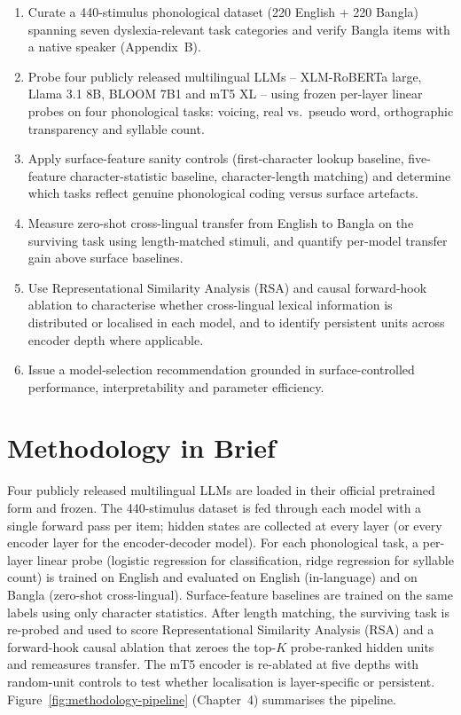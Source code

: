 \begin{enumerate}
    \item Curate a 440-stimulus phonological dataset (220 English + 220 Bangla) spanning seven dyslexia-relevant task categories and verify Bangla items with a native speaker (Appendix~B).
    \item Probe four publicly released multilingual LLMs -- XLM-RoBERTa large, Llama 3.1 8B, BLOOM 7B1 and mT5 XL -- using frozen per-layer linear probes on four phonological tasks: voicing, real vs.\ pseudo word, orthographic transparency and syllable count.
    \item Apply surface-feature sanity controls (first-character lookup baseline, five-feature character-statistic baseline, character-length matching) and determine which tasks reflect genuine phonological coding versus surface artefacts.
    \item Measure zero-shot cross-lingual transfer from English to Bangla on the surviving task using length-matched stimuli, and quantify per-model transfer gain above surface baselines.
    \item Use Representational Similarity Analysis (RSA) and causal forward-hook ablation to characterise whether cross-lingual lexical information is distributed or localised in each model, and to identify persistent units across encoder depth where applicable.
    \item Issue a model-selection recommendation grounded in surface-controlled performance, interpretability and parameter efficiency.
\end{enumerate}

\section{Methodology in Brief}

Four publicly released multilingual LLMs are loaded in their official pretrained form and frozen. The 440-stimulus dataset is fed through each model with a single forward pass per item; hidden states are collected at every layer (or every encoder layer for the encoder-decoder model). For each phonological task, a per-layer linear probe (logistic regression for classification, ridge regression for syllable count) is trained on English and evaluated on English (in-language) and on Bangla (zero-shot cross-lingual). Surface-feature baselines are trained on the same labels using only character statistics. After length matching, the surviving task is re-probed and used to score Representational Similarity Analysis (RSA) and a forward-hook causal ablation that zeroes the top-$K$ probe-ranked hidden units and remeasures transfer. The mT5 encoder is re-ablated at five depths with random-unit controls to test whether localisation is layer-specific or persistent. Figure~\ref{fig:methodology-pipeline} (Chapter~4) summarises the pipeline.

